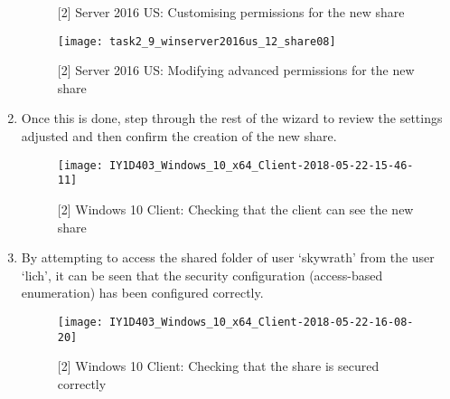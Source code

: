 \begin{enumerate}[series=task2methodology5]
\begin{figure}[H]
      \caption{[2] Server 2016 US: Customising permissions for the new share}
      \label{fig:task2:vspherec_ussf07}
    \end{figure}
    \begin{figure}[H]
      \centering
      \captionsetup{skip=2pt}
      \texttt{[image: task2\_9\_winserver2016us\_12\_share08]}
      \caption{[2] Server 2016 US: Modifying advanced permissions for the new share}
      \label{fig:task2:vspherec_ussf08}
    \end{figure}
  \item {} Once this is done, step through the rest of the wizard to review the settings adjusted and then confirm the creation of the new share.
    \begin{figure}[H]
      \centering
      \captionsetup{skip=2pt}
      \texttt{[image: IY1D403\_Windows\_10\_x64\_Client-2018-05-22-15-46-11]}
      \caption{[2] Windows 10 Client: Checking that the client can see the new share}
      \label{fig:task2:vspherec_ussfx}
    \end{figure}
  \item {} By attempting to access the shared folder of user `skywrath' from the user `lich', it can be seen that the security configuration (access-based enumeration) has been configured correctly.
    \begin{figure}[H]
      \centering
      \captionsetup{skip=2pt}
      \texttt{[image: IY1D403\_Windows\_10\_x64\_Client-2018-05-22-16-08-20]}
      \caption{[2] Windows 10 Client: Checking that the share is secured correctly}
      \label{fig:task2:vspherec_ussfx2}
    \end{figure}
\end{enumerate}
